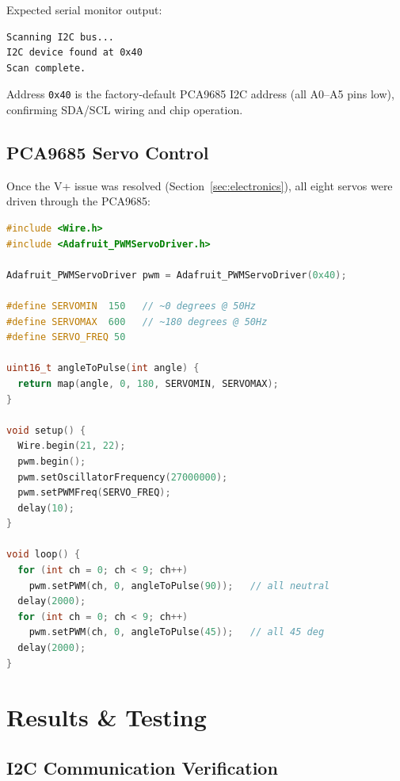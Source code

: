 \documentclass[12pt, a4paper]{article}
\begin{document}
Expected serial monitor output:

\begin{lstlisting}[language={}, caption={I2C Scan Output --- Serial Monitor}, label={lst:i2coutput}]
Scanning I2C bus...
I2C device found at 0x40
Scan complete.
\end{lstlisting}

Address \texttt{0x40} is the factory-default PCA9685 I2C address (all A0--A5
pins low), confirming SDA/SCL wiring and chip operation.

\subsection{PCA9685 Servo Control}

Once the V+ issue was resolved (Section~\ref{sec:electronics}), all eight servos
were driven through the PCA9685:

\begin{lstlisting}[language=C++, caption={PCA9685 All-Channel Servo Sweep}, label={lst:pca9685sweep}]
#include <Wire.h>
#include <Adafruit_PWMServoDriver.h>

Adafruit_PWMServoDriver pwm = Adafruit_PWMServoDriver(0x40);

#define SERVOMIN  150   // ~0 degrees @ 50Hz
#define SERVOMAX  600   // ~180 degrees @ 50Hz
#define SERVO_FREQ 50

uint16_t angleToPulse(int angle) {
  return map(angle, 0, 180, SERVOMIN, SERVOMAX);
}

void setup() {
  Wire.begin(21, 22);
  pwm.begin();
  pwm.setOscillatorFrequency(27000000);
  pwm.setPWMFreq(SERVO_FREQ);
  delay(10);
}

void loop() {
  for (int ch = 0; ch < 9; ch++)
    pwm.setPWM(ch, 0, angleToPulse(90));   // all neutral
  delay(2000);
  for (int ch = 0; ch < 9; ch++)
    pwm.setPWM(ch, 0, angleToPulse(45));   // all 45 deg
  delay(2000);
}
\end{lstlisting}

\section{Results \& Testing}

\subsection{I2C Communication Verification}
\end{document}
